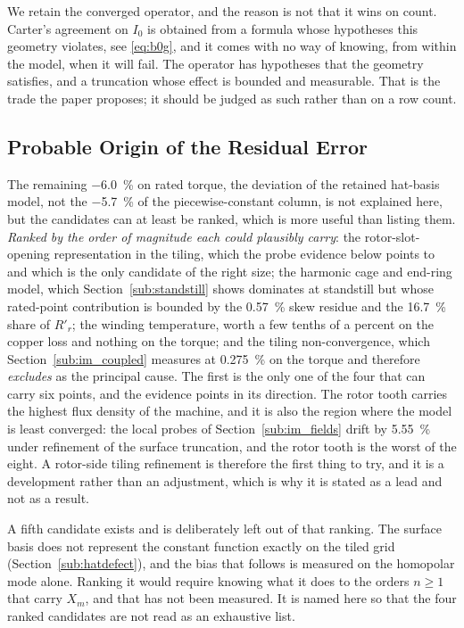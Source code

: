 \documentclass[10pt,a4paper,twocolumn]{article}
\theoremstyle{plain}
\theoremstyle{remark}
\begin{document}
We retain the converged operator, and the reason is not that it wins on
count. Carter's agreement on $I_0$ is obtained from a formula whose
hypotheses this geometry violates, see \eqref{eq:b0g}, and it comes
with no way of knowing, from within the model, when it will fail. The
operator has hypotheses that the geometry satisfies, and a truncation
whose effect is bounded and measurable. That is the trade the paper
proposes; it should be judged as such rather than on a row count.

\subsection{Probable Origin of the Residual Error}

The remaining \SI{-6.0}{\percent} on rated torque, the deviation of the
retained hat-basis model, not the \SI{-5.7}{\percent} of the
piecewise-constant column, is not explained here,
but the candidates can at least be ranked, which is more useful than
listing them. \emph{Ranked by the order of magnitude each could
plausibly carry}: the rotor-slot-opening representation in the tiling,
which the probe evidence below points to and which is the only candidate
of the right size; the harmonic cage and end-ring model, which
Section~\ref{sub:standstill} shows dominates at standstill but whose
rated-point contribution is bounded by the \SI{+0.57}{\percent} skew
residue and the \SI{16.7}{\percent} share of $R'_r$; the winding
temperature, worth a few tenths of a percent on the copper loss and
nothing on the torque; and the tiling non-convergence, which
Section~\ref{sub:im_coupled} measures at \SI{0.275}{\percent} on the
torque and therefore \emph{excludes} as the principal cause. The first
is the only one of the four that can carry six points, and the evidence
points in its direction. The rotor tooth carries the
highest flux density of the machine, and it is also the region where the
model is least converged: the local probes of
Section~\ref{sub:im_fields} drift by \SI{5.55}{\percent} under
refinement of the surface truncation, and the rotor tooth is the worst
of the eight. A rotor-side tiling refinement is therefore the first
thing to try, and it is a development rather than an adjustment, which
is why it is stated as a lead and not as a result.

A fifth candidate exists and is deliberately left out of that ranking.
The surface basis does not represent the constant function exactly on the
tiled grid (Section~\ref{sub:hatdefect}), and the bias that follows is
measured on the homopolar mode alone. Ranking it would require knowing
what it does to the orders $n\ge1$ that carry $X_m$, and that has not
been measured. It is named here so that the four ranked candidates are
not read as an exhaustive list.
\end{document}

